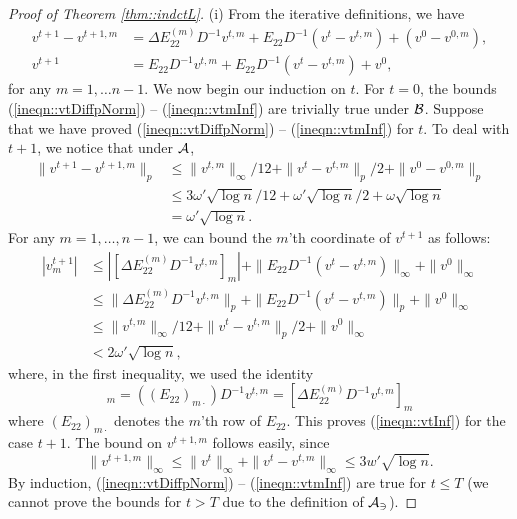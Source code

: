 \documentclass[12pt]{article}%
\theoremstyle{plain}%
\theoremstyle{remark}
\begin{document}
\begin{proof}[Proof of Theorem \ref{thm::indctL}]
(i) From the iterative definitions, we have
\begin{align}
v^{t+1} - v^{t+1,m} &= \Delta E_{22}^{(m)} D^{-1} v^{t,m} + E_{22} D^{-1} (v^t - v^{t,m}) + (v^0 - v^{0,m}), \\
v^{t+1} &= E_{22}D^{-1}v^{t,m} + E_{22}D^{-1}(v^t - v^{t,m}) + v^0,
\end{align}
for any $m=1,\ldots n-1$. We now begin our induction on $t$. For $t=0$, the bounds (\ref{ineqn::vtDiffpNorm}) -- (\ref{ineqn::vtmInf}) are trivially true under $\cal{B}$. Suppose that we have proved (\ref{ineqn::vtDiffpNorm}) -- (\ref{ineqn::vtmInf}) for $t$. To deal with $t+1$, we notice that under $\cal{A}$, 
\begin{align*}
\| v^{t+1} - v^{t+1,m} \|_p & \le \| v^{t,m} \|_{\infty} / 12 + \| v^t - v^{t, m} \|_p / 2 + \| v^0 - v^{0,m} \|_p \\
&\le 3\omega' \sqrt{\log n}  / 12+ \omega' \sqrt{\log n}/2 + \omega \sqrt{\log n} \\
&= \omega' \sqrt{\log n}.
\end{align*}
For any $m=1,\ldots,n-1$, we can bound the $m$'th coordinate of $v^{t+1}$ as follows:
\begin{align*}
| v^{t+1}_m | &\le | [ \Delta E_{22}^{(m)} D^{-1} v^{t,m}]_m | + \| E_{22} D^{-1} ( v^t - v^{t,m} ) \|_{\infty} + \| v^0 \|_{\infty} \\
&\le \| \Delta E_{22}^{(m)} D^{-1} v^{t,m} \|_p + \| E_{22} D^{-1} ( v^t - v^{t,m} ) \|_p + \| v^0 \|_{\infty} \\
&\le \| v^{t,m} \|_{\infty}/12 + \| v^t - v^{t,m} \|_p /2 + \| v^0 \|_{\infty} \\
&< 2\omega' \sqrt{\log n},
\end{align*}
where, in the first inequality, we used the identity
\begin{equation*}
 [E_{22} D^{-1} v^{t,m}]_m  =   ((E_{22})_{m \cdot})D^{-1} v^{t,m} = [\Delta E_{22}^{(m)} D^{-1} v^{t,m}]_m 
\end{equation*} 
where $(E_{22})_{m \cdot}$ denotes the $m$'th row of $E_{22}$. 
This proves (\ref{ineqn::vtInf}) for the case $t+1$. The bound on $v^{t+1,m}$ follows easily, since 
\begin{equation*}
\| v^{t+1,m} \|_\infty \le \|v^t \|_\infty + \|v^t - v^{t,m} \|_\infty \le 3w' \sqrt{\log n}.
\end{equation*}
By induction, (\ref{ineqn::vtDiffpNorm}) -- (\ref{ineqn::vtmInf}) are true for $t \le T$ (we cannot prove the bounds for $t>T$ due to the definition of $\cal{A}_3$).


\end{proof}
\end{document}

